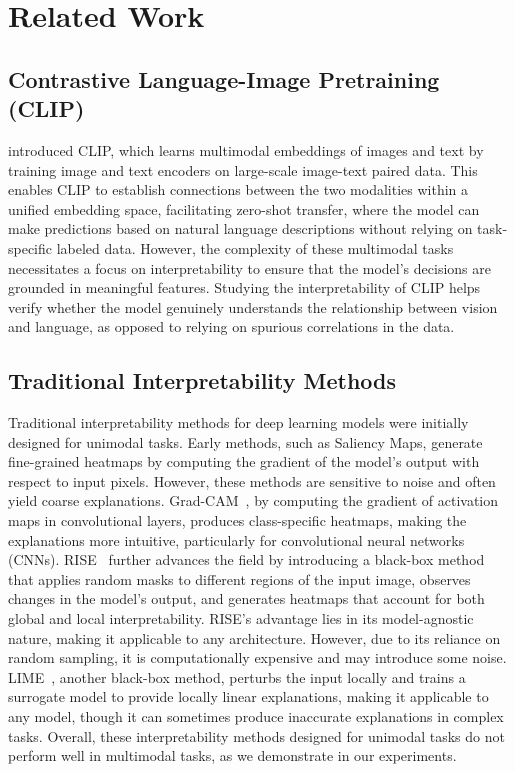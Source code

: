 \section{Related Work}
\subsection{Contrastive Language-Image Pretraining (CLIP)}
\cite{radford2021learning} introduced CLIP, which learns multimodal embeddings of images and text by training image and text encoders on large-scale image-text paired data. This enables CLIP to establish connections between the two modalities within a unified embedding space, facilitating zero-shot transfer, where the model can make predictions based on natural language descriptions without relying on task-specific labeled data. However, the complexity of these multimodal tasks necessitates a focus on interpretability to ensure that the model’s decisions are grounded in meaningful features. Studying the interpretability of CLIP helps verify whether the model genuinely understands the relationship between vision and language, as opposed to relying on spurious correlations in the data.

\subsection{Traditional Interpretability Methods}
Traditional interpretability methods for deep learning models were initially designed for unimodal tasks. Early methods, such as Saliency Maps, generate fine-grained heatmaps by computing the gradient of the model's output with respect to input pixels. However, these methods are sensitive to noise and often yield coarse explanations. Grad-CAM~\citep{selvaraju2017grad}, by computing the gradient of activation maps in convolutional layers, produces class-specific heatmaps, making the explanations more intuitive, particularly for convolutional neural networks (CNNs). RISE~\citep{Petsiuk2018rise} further advances the field by introducing a black-box method that applies random masks to different regions of the input image, observes changes in the model's output, and generates heatmaps that account for both global and local interpretability. RISE’s advantage lies in its model-agnostic nature, making it applicable to any architecture. However, due to its reliance on random sampling, it is computationally expensive and may introduce some noise. LIME~\cite{ribeiro2016should}, another black-box method, perturbs the input locally and trains a surrogate model to provide locally linear explanations, making it applicable to any model, though it can sometimes produce inaccurate explanations in complex tasks. Overall, these interpretability methods designed for unimodal tasks do not perform well in multimodal tasks, as we demonstrate in our experiments.%

